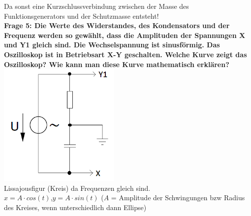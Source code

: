 \documentclass[11pt,a4paper]{scrartcl}
\begin{document}
Da sonst eine Kurzschlussverbindung zwischen der Masse des Funktionsgenerators und der Schutzmasse entsteht!\\
\textbf{Frage 5: Die Werte des Widerstandes, des Kondensators und der Frequenz werden so gewählt, dass die Amplituden der Spannungen X und Y1 gleich sind. Die Wechselspannung ist sinusförmig. Das Oszilloskop ist in Betriebsart X-Y geschalten. Welche Kurve zeigt das Oszilloskop? Wie kann man diese Kurve mathematisch erklären?}\\
\includegraphics[height=6cm,keepaspectratio]{Oszi_Widerstand.png}\\
Lissajousfigur (Kreis) da Frequenzen gleich sind.\\
$x=A \cdot cos(t)$,$y=A \cdot sin(t)$ ($A$ = Amplitude der Schwingungen bzw Radius des Kreises, wenn unterschiedlich dann Ellipse)\\
\end{document}
